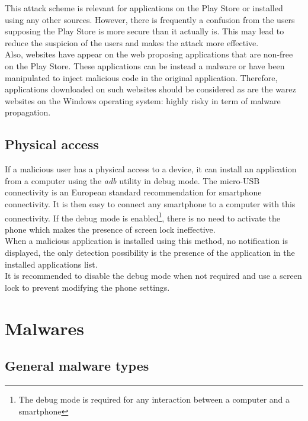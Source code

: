 This attack scheme is relevant for applications on the Play Store or installed using any other sources.
However, there is frequently a confusion from the users supposing the Play Store is more secure than it actually is.
This may lead to reduce the suspicion of the users and makes the attack more effective.\\

Also, websites have appear on the web proposing applications that are non-free on the Play Store.
These applications can be instead a malware or have been manipulated to inject malicious code in the original application.
Therefore, applications downloaded on such websites should be considered as are the warez websites on the Windows operating system: highly risky in term of malware propagation.

\subsection{Physical access}

If a malicious user has a physical access to a device, it can install an application from a computer using the \emph{adb} utility in debug mode.
The micro-USB connectivity is an European standard recommendation for smartphone connectivity.
It is then easy to connect any smartphone to a computer with this connectivity.
If the debug mode is enabled\footnote{The debug mode is required for any interaction between a computer and a smartphone}, there is no need to activate the phone which makes the presence of screen lock ineffective.\\

When a malicious application is installed using this method, no notification is displayed, the only detection possibility is the presence of the application in the installed applications list.\\

It is recommended to disable the debug mode when not required and use a screen lock to prevent modifying the phone settings.

\section{Malwares}
\label{sec:and-malware}

\subsection{General malware types}
\label{sec:malware-type}

